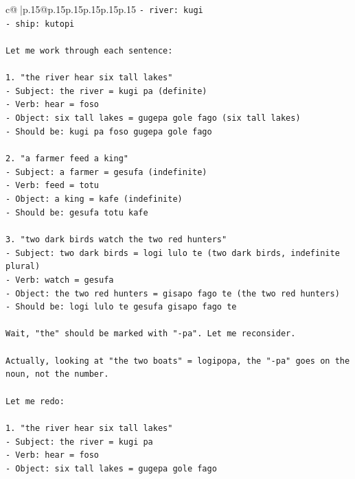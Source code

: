 \documentclass{article}
\begin{document}
{\begin{supertabular}{c@{$\;$}|p{.15\linewidth}@{}p{.15\linewidth}p{.15\linewidth}p{.15\linewidth}p{.15\linewidth}p{.15\linewidth}}
{{{\texttt{{-} river: kugi} \\
\texttt{{-} ship: kutopi} \\
\\ 
\texttt{Let me work through each sentence:} \\
\\ 
\texttt{1. "the river hear six tall lakes"} \\
\texttt{{-} Subject: the river = kugi pa (definite)} \\
\texttt{{-} Verb: hear = foso} \\
\texttt{{-} Object: six tall lakes = gugepa gole fago (six tall lakes)} \\
\texttt{{-} Should be: kugi pa foso gugepa gole fago} \\
\\ 
\texttt{2. "a farmer feed a king"} \\
\texttt{{-} Subject: a farmer = gesufa (indefinite)} \\
\texttt{{-} Verb: feed = totu} \\
\texttt{{-} Object: a king = kafe (indefinite)} \\
\texttt{{-} Should be: gesufa totu kafe} \\
\\ 
\texttt{3. "two dark birds watch the two red hunters"} \\
\texttt{{-} Subject: two dark birds = logi lulo te (two dark birds, indefinite plural)} \\
\texttt{{-} Verb: watch = gesufa} \\
\texttt{{-} Object: the two red hunters = gisapo fago te (the two red hunters)} \\
\texttt{{-} Should be: logi lulo te gesufa gisapo fago te} \\
\\ 
\texttt{Wait, "the" should be marked with "{-}pa". Let me reconsider.} \\
\\ 
\texttt{Actually, looking at "the two boats" = logipopa, the "{-}pa" goes on the noun, not the number.} \\
\\ 
\texttt{Let me redo:} \\
\\ 
\texttt{1. "the river hear six tall lakes"} \\
\texttt{{-} Subject: the river = kugi pa} \\
\texttt{{-} Verb: hear = foso} \\
\texttt{{-} Object: six tall lakes = gugepa gole fago} \\
}}}
\end{supertabular}}
\end{document}
